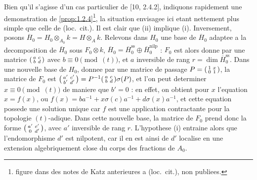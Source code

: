 \documentclass[12pt,a4paper]{article}
\theoremstyle{plain}
\theoremstyle{definition}
\theoremstyle{remark}
\begin{document}
Bien qu'il s'agisse d'un cas particulier de [10, 2.4.2], indiquons rapidement une demonstration de \ref{prop:1.2.4}\footnote{figure dans des notes de Katz anterieures a (loc.\ cit.), non publiees.}, la situation envisagee ici etant nettement plus simple que celle de (loc.\ cit.). Il est clair que (ii) implique (i). Inversement, posons $\overline{H}_0 = H_0 \otimes_{A_0} k = H \otimes_A k$. Relevons dans $H_0$ une base de $\overline{H}_0$ adaptee a la decomposition de $\overline{H}_0$ sous $F_0 \otimes k$, $\overline{H}_0 = \overline{H}_0^{\mathrm{ss}} \oplus \overline{H}_0^{\mathrm{nilp}}$ : $F_0$ est alors donne par une matrice $\begin{psmallmatrix} a & c \\ b & d \end{psmallmatrix}$ avec $b \equiv 0 \pmod{(t)}$, et $a$ inversible de rang $r = \dim \overline{H}_0^{\mathrm{ss}}$. Dans une nouvelle base de $H_0$, donnee par une matrice de passage $P = \begin{psmallmatrix} 1 & x \\ 0 & 1 \end{psmallmatrix}$, la matrice de $F_0$ est $\begin{psmallmatrix} a' & c' \\ b' & d' \end{psmallmatrix} = P^{-1}\begin{psmallmatrix} a & c \\ b & d \end{psmallmatrix}\sigma(P)$, et l'on peut determiner $x \equiv 0 \pmod{(t)}$ de maniere que $b' = 0$ : en effet, on obtient pour $x$ l'equation $x = f(x)$, ou $f(x) = ba^{-1} + x\sigma(c)a^{-1} + d\sigma(x)a^{-1}$, et cette equation possede une solution unique car $f$ est une application contractante pour la topologie $(t)$-adique. Dans cette nouvelle base, la matrice de $F_0$ prend donc la forme $\begin{psmallmatrix} a' & c' \\ 0 & d' \end{psmallmatrix}$, avec $a'$ inversible de rang $r$. L'hypothese (i) entraine alors que l'endomorphisme $d'$ est nilpotent, car il en est ainsi de $d'$ localise en une extension algebriquement close du corps des fractions de $A_0$.
\end{document}
